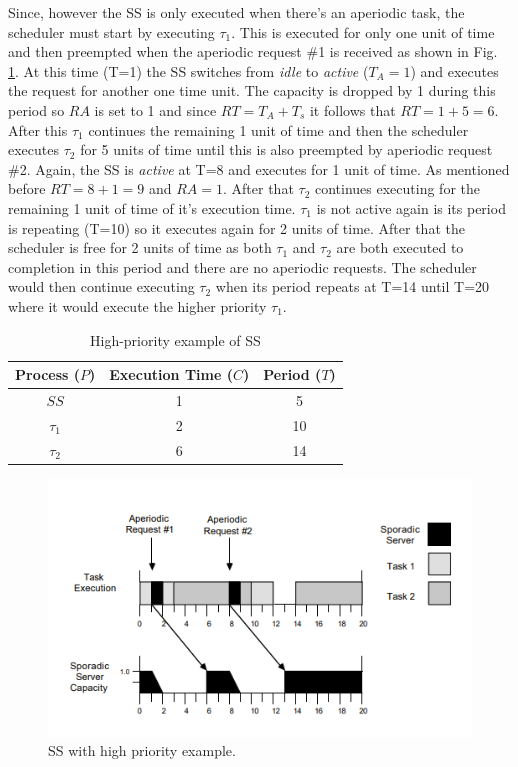 \documentclass[conference]{IEEEtran}
\begin{document}
Since, however the SS is only executed when there's an aperiodic task, the scheduler must start by executing $\tau_1$. This is executed for only one unit of time and then preempted when the aperiodic request \#1 is received as shown in Fig. \ref{fig:high priority ss graph}. At this time (T=1) the SS switches from \textit{idle} to \textit{active} ($T_A = 1$) and executes the request for another one time unit. The capacity is dropped by 1 during this period so $RA$ is set to 1 and since $RT = T_A + T_s$ it follows that $RT= 1+5=6$. After this $\tau_1$ continues the remaining 1 unit of time and then the scheduler executes $\tau_2$ for 5 units of time until this is also preempted by aperiodic request \#2. Again, the SS is \textit{active} at T=8 and executes for 1 unit of time. As mentioned before $RT= 8+1=9$ and $RA=1$. After that $\tau_2$ continues executing for the remaining 1 unit of time of it's execution time. $\tau_1$ is not active again is its period is repeating (T=10) so it executes again for 2 units of time. After that the scheduler is free for 2 units of time as both $\tau_1$ and $\tau_2$ are both executed to completion in this period and there are no aperiodic requests. The scheduler would then continue executing $\tau_2$ when its period repeats at T=14 until T=20 where it would execute the higher priority $\tau_1$.
\begin{table}[h]
    \centering
    \begin{tabular}{ |c|c|c| } 
    \hline
        Process ($P$) & Execution Time ($C$) & Period ($T$)\\
        \hline\hline
         ${SS}$& 1 & 5 \\
         \hline
         ${\tau_1}$& 2 & 10 \\
         \hline
         ${\tau_2}$& 6 & 14 \\
         \hline
         
    \end{tabular}
    \vspace{1em}
    \caption{High-priority example of SS}
    \label{tab:high priority ss table}
\end{table}
\begin{figure}[h]
    \centering
    \includegraphics{high priority ss.png}
    \caption{SS with high priority example.}
    \label{fig:high priority ss graph}
\end{figure}
\end{document}
